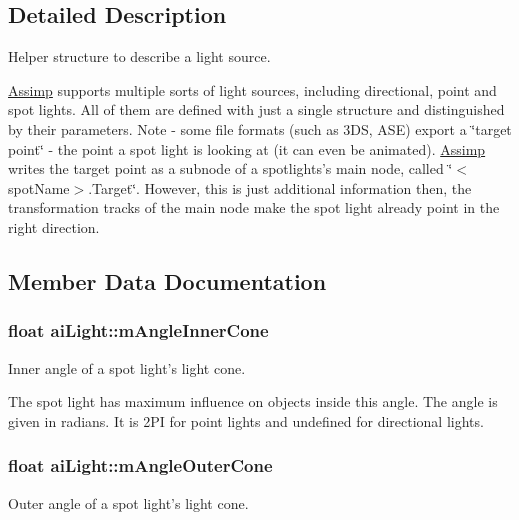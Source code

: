 \subsection{Detailed Description}
Helper structure to describe a light source.

\hyperlink{namespace_assimp}{Assimp} supports multiple sorts of light sources, including directional, point and spot lights. All of them are defined with just a single structure and distinguished by their parameters. Note -\/ some file formats (such as 3\-D\-S, A\-S\-E) export a \char`\"{}target point\char`\"{} -\/ the point a spot light is looking at (it can even be animated). \hyperlink{namespace_assimp}{Assimp} writes the target point as a subnode of a spotlights's main node, called \char`\"{}$<$spot\-Name$>$.\-Target\char`\"{}. However, this is just additional information then, the transformation tracks of the main node make the spot light already point in the right direction. 

\subsection{Member Data Documentation}
\hypertarget{structai_light_abad0466811938623e98bf1d334143f9a}{
\subsubsection[{m\-Angle\-Inner\-Cone}]{\setlength{\rightskip}{0pt plus 5cm}float ai\-Light\-::m\-Angle\-Inner\-Cone}}\label{structai_light_abad0466811938623e98bf1d334143f9a}
Inner angle of a spot light's light cone.

The spot light has maximum influence on objects inside this angle. The angle is given in radians. It is 2\-P\-I for point lights and undefined for directional lights. \hypertarget{structai_light_a20fd332a5f9d8e8cb94816ff2b0ae7f4}{
\subsubsection[{m\-Angle\-Outer\-Cone}]{\setlength{\rightskip}{0pt plus 5cm}float ai\-Light\-::m\-Angle\-Outer\-Cone}}\label{structai_light_a20fd332a5f9d8e8cb94816ff2b0ae7f4}
Outer angle of a spot light's light cone.


